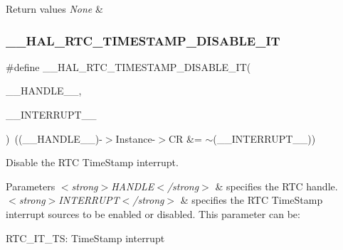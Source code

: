 \begin{DoxyRetVals}{Return values}
{\em None} & \\
\hline
\end{DoxyRetVals}
\mbox{\label{group___r_t_c_ex___timestamp_gab455d21f8afb5b3d49f2c25e34ce90c2}} 
\subsubsection{\texorpdfstring{\+\_\+\+\_\+\+H\+A\+L\+\_\+\+R\+T\+C\+\_\+\+T\+I\+M\+E\+S\+T\+A\+M\+P\+\_\+\+D\+I\+S\+A\+B\+L\+E\+\_\+\+IT}{\_\_HAL\_RTC\_TIMESTAMP\_DISABLE\_IT}}
{\footnotesize\ttfamily \#define \+\_\+\+\_\+\+H\+A\+L\+\_\+\+R\+T\+C\+\_\+\+T\+I\+M\+E\+S\+T\+A\+M\+P\+\_\+\+D\+I\+S\+A\+B\+L\+E\+\_\+\+IT(\begin{DoxyParamCaption}\item[{}]{\+\_\+\+\_\+\+H\+A\+N\+D\+L\+E\+\_\+\+\_\+,  }\item[{}]{\+\_\+\+\_\+\+I\+N\+T\+E\+R\+R\+U\+P\+T\+\_\+\+\_\+ }\end{DoxyParamCaption})~((\+\_\+\+\_\+\+H\+A\+N\+D\+L\+E\+\_\+\+\_\+)-\/$>$Instance-\/$>$CR \&= $\sim$(\+\_\+\+\_\+\+I\+N\+T\+E\+R\+R\+U\+P\+T\+\_\+\+\_\+))}



Disable the R\+TC Time\+Stamp interrupt. 


\begin{DoxyParams}{Parameters}
{\em $<$strong$>$\+H\+A\+N\+D\+L\+E$<$/strong$>$} & specifies the R\+TC handle. \\
\hline
{\em $<$strong$>$\+I\+N\+T\+E\+R\+R\+U\+P\+T$<$/strong$>$} & specifies the R\+TC Time\+Stamp interrupt sources to be enabled or disabled. This parameter can be\+: \begin{DoxyItemize}
\item R\+T\+C\+\_\+\+I\+T\+\_\+\+TS\+: Time\+Stamp interrupt \end{DoxyItemize}
\\
\hline
\end{DoxyParams}

